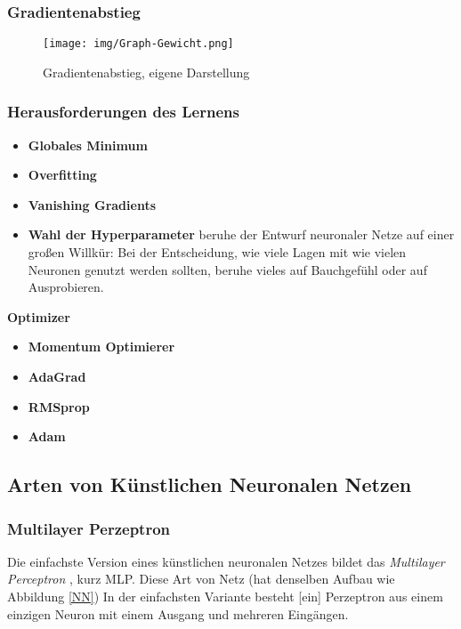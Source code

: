 {\subsubsection{Gradientenabstieg}
\begin{figure}[H]
	\centering
	\texttt{[image: img/Graph-Gewicht.png]}
	\caption{Gradientenabstieg, eigene Darstellung}
	\label{fig:NN}
\end{figure}


\subsubsection{Herausforderungen des Lernens} 
\begin{itemize}
	\item \textbf{Globales Minimum}
	\item \textbf{Overfitting}
	\item \textbf{Vanishing Gradients}
	\item \textbf{Wahl der Hyperparameter}
	\glqq beruhe der Entwurf neuronaler Netze auf einer großen Willkür: Bei der Entscheidung, wie viele Lagen mit wie vielen Neuronen genutzt werden sollten, beruhe vieles auf Bauchgefühl oder auf Ausprobieren.\grqq{} \cite[S.44]{3}
	
\end{itemize}


\textbf{Optimizer}

\begin{itemize}
	\item \textbf{Momentum Optimierer} 
	\item \textbf{AdaGrad} 
	\item \textbf{RMSprop}  
	\item \textbf{Adam}  
\end{itemize}

\subsection{Arten von Künstlichen Neuronalen Netzen}
\subsubsection{Multilayer Perzeptron}
\glqq Die einfachste Version eines künstlichen neuronalen Netzes bildet das \textit{Multilayer Perceptron}\grqq{} \cite[S. 72]{12}, kurz MLP. 
Diese Art von Netz (hat denselben Aufbau wie Abbildung \ref{NN}) 
\glqq In der einfachsten Variante besteht [ein] Perzeptron aus einem einzigen Neuron mit einem Ausgang und mehreren Eingängen.\grqq{} \cite{15}

}
